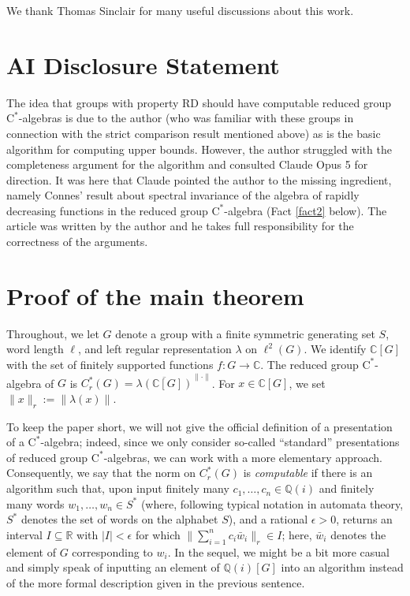 \documentclass{amsart}
\newcommand{\C}{\mathbb{C}}
\newcommand{\cstar}{$\mathrm{C}^*$}
\newcommand{\Cr}{C^*_r(G)}
\theoremstyle{plain}
\theoremstyle{definition}
\numberwithin{equation}{section}
\begin{document}
We thank Thomas Sinclair for many useful discussions about this work.

\section*{AI Disclosure Statement}

The idea that groups with property RD should have computable reduced group \cstar-algebras is due to the author (who was familiar with these groups in connection with the strict comparison result mentioned above) as is the basic algorithm for computing upper bounds.  However, the author struggled with the completeness argument for the algorithm and consulted Claude Opus 5 for direction.  It was here that Claude pointed the author to the missing ingredient, namely Connes' result about spectral invariance of the algebra of rapidly decreasing functions in the reduced group \cstar-algebra (Fact \ref{fact2} below).  The article was written by the author and he takes full responsibility for the correctness of the arguments. 

\section{Proof of the main theorem}

Throughout, we let $G$ denote a group with a finite symmetric generating set $S$, word length $\ell$, and left regular representation $\lambda$ on $\ell^2(G)$. We identify $\mathbb{C}[G]$ with the set of finitely supported functions $f:G\to \mathbb{C}$.  The reduced group \cstar-algebra of $G$ is $\Cr=\overline{\lambda(\C[G])}^{\|\cdot\|}$. For $x\in \mathbb{C}[G]$, we set $\|x\|_r:=\|\lambda(x)\|$.

To keep the paper short, we will not give the official definition of a presentation of a \cstar-algebra; indeed, since we only consider so-called ``standard'' presentations of reduced group \cstar-algebras, we can work with a more elementary approach.  Consequently, we say that the norm on $C^*_r(G)$ is \emph{computable} if there is an algorithm such that, upon input finitely many $c_1,\ldots,c_n\in \mathbb{Q}(i)$ and finitely many words $w_1,\ldots,w_n\in S^*$ (where, following typical notation in automata theory, $S^*$ denotes the set of words on the alphabet $S$), and a rational $\epsilon>0$, returns an interval $I\subseteq \mathbb{R}$ with $|I|<\epsilon$ for which $\|\sum_{i=1}^n c_i\bar w_i\|_r\in I$; here, $\bar w_i$ denotes the element of $G$ corresponding to $w_i$.  In the sequel, we might be a bit more casual and simply speak of inputting an element of $\mathbb{Q}(i)[G]$ into an algorithm instead of the more formal description given in the previous sentence.
\end{document}
